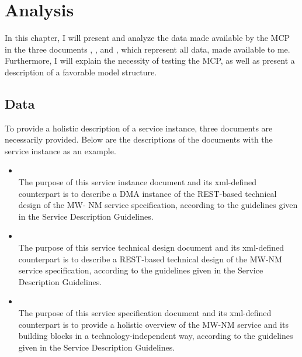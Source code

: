 \chapter{Analysis}


In this chapter, I will present and analyze the data made available by the MCP in the three documents , , and , which represent all data, made available to me. Furthermore, I will explain the necessity of testing the MCP, as well as present a description of a favorable model structure. 

\section{Data} %

To provide a holistic description of a service instance, three documents are necessarily provided. Below are the descriptions of the documents with the service instance  as an example.
\begin{itemize}
	\item {} \\
	The purpose of this service instance document and its xml-defined counterpart is to describe a DMA instance of the REST-based technical design of the MW- NM service specification, according to the guidelines given in the Service Description Guidelines.
	\item {} \\
	The purpose of this service technical design document and its xml-defined counterpart is to describe a REST-based technical design of the MW-NM service specification, according to the guidelines given in the Service Description Guidelines.
	\item {} \\
	The purpose of this service specification document and its xml-defined counterpart is to provide a holistic overview of the MW-NM service and its building blocks in a technology-independent way, according to the guidelines given in the Service Description Guidelines.
\end{itemize}

